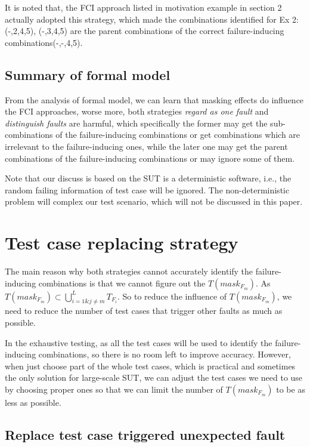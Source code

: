 \documentclass{sig-alternate}
\begin{document}
It is noted that, the FCI approach listed in motivation example in section 2 actually adopted this strategy, which made the combinations identified for Ex 2: (-,2,4,5), (-,3,4,5) are the parent combinations of the correct failure-inducing combinations(-,-,4,5).

\subsection{Summary of formal model}
From the analysis of formal model, we can learn that masking effects do influence the FCI approaches, worse more, both strategies \emph{regard as one fault} and \emph{distinguish faults} are harmful, which specifically the former may get the sub-combinations of the failure-inducing combinations or get combinations which are irrelevant to the failure-inducing ones, while the later one may get the parent combinations of the failure-inducing combinations or may ignore some of them.

Note that our discuss is based on the SUT is a deterministic software, i.e., the random failing information of test case will be ignored. The non-deterministic problem will complex our test scenario, which will not be discussed in this paper.

\section{Test case replacing strategy}
The main reason why both strategies cannot accurately identify the failure-inducing combinations is that we cannot figure out the $T(mask_{F_{m}})$.  As $T(mask_{F_{m}}) \subset \bigcup_{i = 1 \& j \neq m }^{L}T_{F_{i}}$. So to reduce the influence of $T(mask_{F_{m}})$, we need to reduce the number of test cases that trigger other faults as much as possible.

In the exhaustive testing, as all the test cases will be used to identify the failure-inducing combinations, so there is no room left to improve accuracy. However, when just choose part of the whole test cases, which is practical and sometimes the only solution for large-scale SUT, we can adjust the test cases we need to use by choosing proper ones so that we can limit the number of $T(mask_{F_{m}})$ to  be as less as possible.

\subsection{Replace test case triggered unexpected fault}
\end{document}
